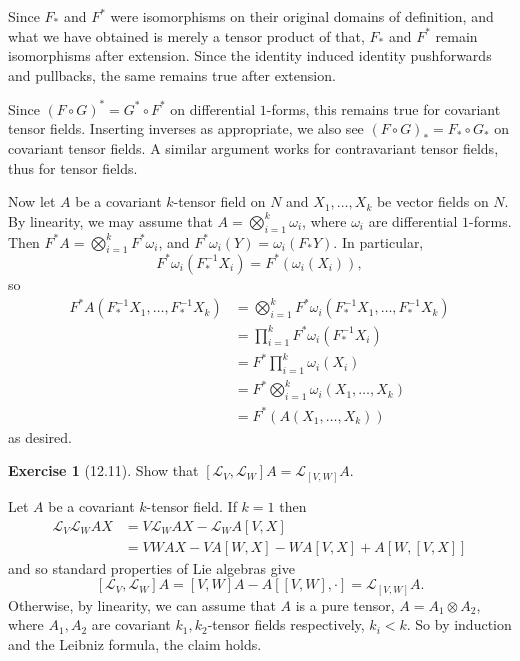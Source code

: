 \documentclass[10pt]{article}
\theoremstyle{definition}
\newtheorem{exer}{Exercise}
\begin{document}
Since $F_*$ and $F^*$ were isomorphisms on their original domains of definition, and what we have obtained is merely a tensor product of that, $F_*$ and $F^*$ remain isomorphisms after extension.
Since the identity induced identity pushforwards and pullbacks, the same remains true after extension.

Since $(F \circ G)^* = G^* \circ F^*$ on differential $1$-forms, this remains true for covariant tensor fields.
Inserting inverses as appropriate, we also see $(F \circ G)_* = F_* \circ G_*$ on covariant tensor fields.
A similar argument works for contravariant tensor fields, thus for tensor fields.

Now let $A$ be a covariant $k$-tensor field on $N$ and $X_1, \dots, X_k$ be vector fields on $N$.
By linearity, we may assume that $A = \bigotimes_{i=1}^k \omega_i$, where $\omega_i$ are differential $1$-forms.
Then $F^*A = \bigotimes_{i=1}^k F^*\omega_i$, and $F^*\omega_i(Y) = \omega_i(F_*Y)$.
In particular,
$$F^*\omega_i(F_*^{-1} X_i) = F^*(\omega_i(X_i)),$$
so
\begin{align*}F^*A(F_*^{-1}X_1, \dots, F_*^{-1}X_k) &= \bigotimes_{i=1}^k F^*\omega_i(F_*^{-1}X_1, \dots, F_*^{-1}X_k) \\
&= \prod_{i=1}^k F^*\omega_i(F_*^{-1}X_i) \\
&= F^*\prod_{i=1}^k \omega_i(X_i)\\
&= F^*\bigotimes_{i=1}^k \omega_i(X_1, \dots, X_k)\\
&= F^*(A(X_1, \dots, X_k))\end{align*}
as desired.


\begin{exer}[12.11]
Show that $[\mathcal L_V, \mathcal L_W] A = \mathcal L_{[V, W]} A$.
\end{exer}

Let $A$ be a covariant $k$-tensor field.
If $k = 1$ then
\begin{align*}\mathcal L_V \mathcal L_W AX &= V \mathcal L_W AX - \mathcal L_W A[V, X]\\
&= VWAX - VA[W, X] - WA[V, X] + A[W, [V, X]]\end{align*}
and so standard properties of Lie algebras give
$$[\mathcal L_V, \mathcal L_W] A = [V, W] A - A[[V, W], \cdot] = \mathcal L_{[V, W]} A.$$
Otherwise, by linearity, we can assume that $A$ is a pure tensor, $A = A_1 \otimes A_2$, where $A_1,A_2$ are covariant $k_1, k_2$-tensor fields respectively, $k_i < k$.
So by induction and the Leibniz formula, the claim holds.
\end{document}
